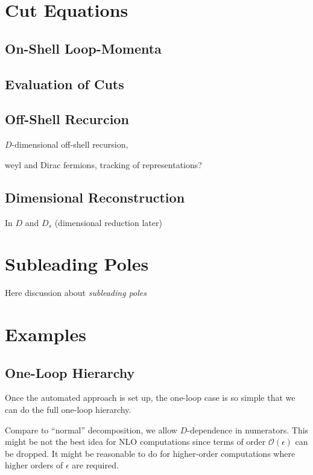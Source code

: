 \section{Cut Equations}

\subsection{On-Shell Loop-Momenta}


\subsection{Evaluation of Cuts}

\subsection{Off-Shell Recurcion}
\label{sec:BG_recursion}

$D$-dimensional off-shell recursion, 


weyl and Dirac fermions, 
tracking of representations?


\subsection{Dimensional Reconstruction}
 In $D$ and $D_s$ (dimensional reduction later)


\section{Subleading Poles}
Here discussion about \textit{subleading poles}



\section{Examples}

\subsection{One-Loop Hierarchy}

Once the automated approach is set up, the one-loop case is so simple that we can
do the full one-loop hierarchy.

Compare to ``normal'' decomposition, we allow $D$-dependence in numerators. This might be not the best
idea for NLO computations since terms of order $\mathcal{O}(\epsilon)$ can be dropped.
It might be reasonable to do for higher-order computations where higher orders of $\epsilon$ are required.


